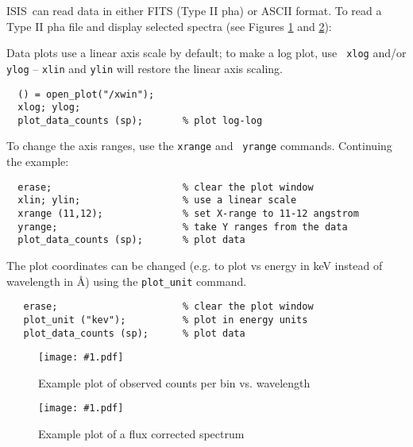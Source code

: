 \documentclass{book}
\newcommand{\putfig}[1]{\texttt{[image: \#1.pdf]}}
\newcommand{\putfig}[1]{\psfig{file=#1.ps}}
\newcommand{\isisx}{{\sc ISIS~}}
\begin{document}
\isisx can read data in either FITS (Type II pha) or ASCII format.
To read a Type II pha file and display selected spectra (see Figures
\ref{fig:data_cts} and \ref{fig:data_flx}):



Data plots use a linear axis scale by default; to make a log plot, use {\tt
xlog} and/or {\tt ylog} -- {\tt xlin} and {\tt ylin} will restore the linear
axis scaling.

\begin{verbatim}
  () = open_plot("/xwin");
  xlog; ylog;
  plot_data_counts (sp);       % plot log-log
\end{verbatim}

To change the axis ranges, use the {\tt xrange} and {\tt
yrange} commands.  Continuing the example:

\begin{verbatim}
  erase;                       % clear the plot window
  xlin; ylin;                  % use a linear scale
  xrange (11,12);              % set X-range to 11-12 angstrom
  yrange;                      % take Y ranges from the data
  plot_data_counts (sp);       % plot data
\end{verbatim}

The plot coordinates can be changed (e.g. to plot vs energy in keV
instead of wavelength in \AA) using the {\tt plot\_unit} command.

\begin{verbatim}
   erase;                      % clear the plot window
   plot_unit ("kev");          % plot in energy units
   plot_data_counts (sp);      % plot data
\end{verbatim}

\begin{figure}[ht]
\putfig{figures/data_cts}
\caption{Example plot of observed counts per bin vs. wavelength}
\label{fig:data_cts}
\end{figure}

\begin{figure}[ht]
\putfig{figures/data_flx}
\caption{Example plot of a flux corrected spectrum}
\label{fig:data_flx}
\end{figure}
\end{document}
